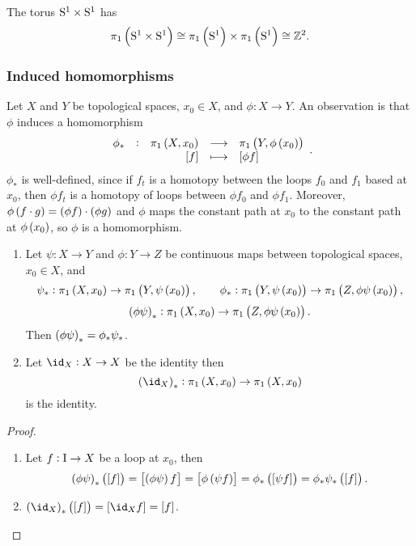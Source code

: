 \begin{example*}
The torus $ \S^1 \times \S^1 $ has
$$ \pi_1\br{\S^1 \times \S^1} \cong \pi_1\br{\S^1} \times \pi_1\br{\S^1} \cong \ZZ^2. $$
\end{example*}

\subsubsection{Induced homomorphisms}

Let $ X $ and $ Y $ be topological spaces, $ x_0 \in X $, and $ \phi : X \to Y $. An observation is that $ \phi $ induces a homomorphism
$$ \function[\phi_*]{\pi_1\br{X, x_0}}{\pi_1\br{Y, \phi\br{x_0}}}{\sbr{f}}{\sbr{\phi f}}. $$
$ \phi_* $ is well-defined, since if $ f_t $ is a homotopy between the loops $ f_0 $ and $ f_1 $ based at $ x_0 $, then $ \phi f_t $ is a homotopy of loops between $ \phi f_0 $ and $ \phi f_1 $. Moreover, $ \phi\br{f \cdot g} = \br{\phi f} \cdot \br{\phi g} $ and $ \phi $ maps the constant path at $ x_0 $ to the constant path at $ \phi\br{x_0} $, so $ \phi $ is a homomorphism.

\begin{proposition}
\hfill
\begin{enumerate}
\item Let $ \psi : X \to Y $ and $ \phi : Y \to Z $ be continuous maps between topological spaces, $ x_0 \in X $, and
$$ \psi_* : \pi_1\br{X, x_0} \to \pi_1\br{Y, \psi\br{x_0}}, \qquad \phi_* : \pi_1\br{Y, \psi\br{x_0}} \to \pi_1\br{Z, \phi\psi\br{x_0}}, $$
$$ \br{\phi\psi}_* : \pi_1\br{X, x_0} \to \pi_1\br{Z, \phi\psi\br{x_0}}. $$
Then $ \br{\phi\psi}_* = \phi_*\psi_* $.
\item Let $ \id_X : X \to X $ be the identity then
$$ \br{\id_X}_* : \pi_1\br{X, x_0} \to \pi_1\br{X, x_0} $$
is the identity.
\end{enumerate}
\end{proposition}

\begin{proof}
\hfill
\begin{enumerate}
\item Let $ f : \I \to X $ be a loop at $ x_0 $, then
$$ \br{\phi\psi}_*\br{\sbr{f}} = \sbr{\br{\phi\psi}f} = \sbr{\phi\br{\psi f}} = \phi_*\br{\sbr{\psi f}} = \phi_*\psi_*\br{\sbr{f}}. $$
\item $ \br{\id_X}_*\br{\sbr{f}} = \sbr{\id_Xf} = \sbr{f} $.
\end{enumerate}
\end{proof}


